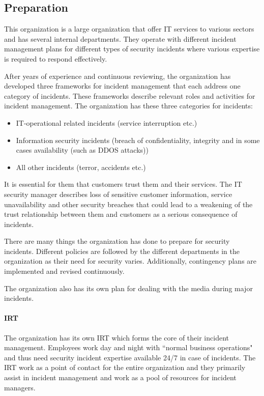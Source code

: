 \subsection{Preparation}
This organization is a large organization that offer IT services to various sectors and has several internal departments. They operate with different incident management plans for different types of security incidents where various expertise is required to respond effectively.  

After years of experience and continuous reviewing, the organization has developed three frameworks for incident management that each address one category of incidents. These frameworks describe relevant roles and activities for incident management. The organization has these three categories for incidents:
\begin{itemize}
\item IT-operational related incidents (service interruption etc.)
\item Information security incidents (breach of confidentiality, integrity and in some cases availability (such as DDOS attacks))
\item All other incidents (terror, accidents etc.)
\end{itemize}
 
It is essential for them that customers trust them and their services. The IT security manager describes loss of sensitive customer information, service unavailability and other security breaches that could lead to a weakening of the trust relationship between them and customers as a serious consequence of incidents. 

There are many things the organization has done to prepare for security incidents. Different policies are followed by the different departments in the organization as their need for security varies. Additionally, contingency plans are implemented and revised continuously. 

The organization also has its own plan for dealing with the media during major incidents. 

\paragraph{\acl{IRT}}
The organization has its own \ac{IRT} which forms the core of their incident management. Employees work day and night with ``normal business operations" and thus need security incident expertise available 24/7 in case of incidents. The \ac{IRT} work as a point of contact for the entire organization and they primarily assist in incident management and work as a pool of resources for incident managers.

